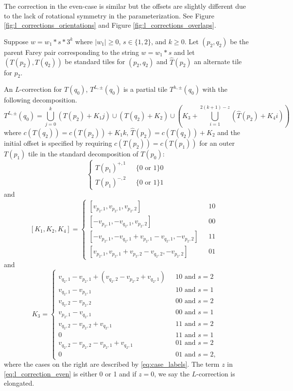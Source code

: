 \documentclass[12pt]{amsart}
\begin{document}
The correction in the even-case is similar but the offsets are slightly different 
due to the lack of rotational symmetry in the parameterization. 	See Figure \ref{fig:l_corrections_orientations} and Figure \ref{fig:l_corrections_overlaps}. 

\begin{definition} \label{def:even_l_correction}

	
	Suppose $w = w_1 * s * 3^k$ where $|w_1| \geq 0$, $s \in \{1,2\}$, and $k \geq 0$.
	Let $(p_2, q_2)$ be the parent Farey pair corresponding to the string $w = w_1*s$ and let $(T(p_2), T(q_2))$ be standard tiles for $(p_2,q_2)$ and $\hat{T}(p_2)$ an alternate tile for $p_2$. 
	

	 An $L$-correction for $T(q_0)$, $T^{L,\pm}(q_0)$ is a partial tile $T^{h, \pm}(q_0)$ with the following decomposition. 
	\begin{equation}\label{eq:l_correction_even}
	T^{L,\pm}(q_0) = \bigcup_{j=0}^{k} (T(p_2) + K_1 j) \cup  (T(q_2) + K_2) \cup \left(K_3 + \bigcup_{i=1}^{2(k+1)-z} (\hat{T}(p_2) +  K_4 i)\right)
	\end{equation}
	where $c(T(q_2)) = c(T(p_2)) + K_1 k$, $\hat{T}(p_2) = c(T(q_2)) + K_2$ and the initial offset is specified by requiring $c(T(p_2)) = c(T(p_1))$ for an outer $T(p_1)$ tile in the standard decomposition of $T(p_0)$:
	\[
	\begin{cases}
	T(p_1)^{+,1}  &\mbox{ $\{0 \mbox{ or } 1\}0$} \\
	T(p_1)^{-,2} &\mbox{ $\{0 \mbox{ or } 1\}1$} 
	\end{cases}
	\]
	and
	 \[
	 [K_1,K_2,K_4] = 
	 \begin{cases}
	[v_{p_2,1}, v_{p_2,1}, v_{p_2,2}] &\mbox{ $1 0$  } \\
	[-v_{p_2,1}, -v_{q_2,1}, v_{p_2,2}]  &\mbox{ $0 0$ } \\
	[-v_{p_2,1}, -v_{q_2,1}+v_{p_2,1}-v_{q_2,1}, -v_{p_2,2}]  &\mbox{ $1 1$ } \\
	[v_{p_2,1}, v_{p_2,1} + v_{p_2,2} -v_{q_2,2}, -v_{p_2,2}] &\mbox{ $0 1$ } 
	 \end{cases}
	 \]
	 and
	 \[
	 K_3 = 
	 \begin{cases}
	 v_{q_2,1}-v_{p_2,1}  + (v_{q_2,2} - v_{p_2,2} + v_{q_2,1} )  &\mbox{ $1 0$ and $s=2$} \\
	 v_{q_2,1}-v_{p_2,1}  	&\mbox{ $1 0$ and $s=1$} \\
	 v_{q_2,2} - v_{p_2,2}  &\mbox{ $0 0$ and $s=2$} \\
	 v_{p_2,1} - v_{q_2,1} &\mbox{ $0 0$ and $s=1$} \\
	 v_{q_2,2} - v_{p_2,2} + v_{q_2,1} &\mbox{ $1 1$ and $s=2$} \\
	 0 &\mbox{ $1 1$ and $s=1$ }\\
	 v_{q_2,2} - v_{p_2,2} - v_{p_2,1} + v_{q_2,1} &\mbox{ $0 1$ and $s=2$} \\
	 	0 &\mbox{ $0 1$ and $s=2$},
	 \end{cases}
	 \]
	 where the cases on the right are described by \eqref{eq:case_labels}. The term $z$ in \eqref{eq:l_correction_even} is either 0 or 1 and if $z = 0$, we say the $L$-correction is elongated. 
	 
	 


\end{definition}
\end{document}
